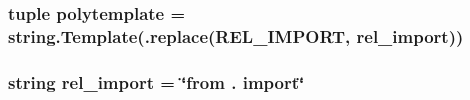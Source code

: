 \subsubsection[{polytemplate}]{\setlength{\rightskip}{0pt plus 5cm}tuple polytemplate = string.\+Template(.replace(\textquotesingle{}R\+E\+L\+\_\+\+I\+M\+P\+O\+R\+T\textquotesingle{}, {\bf rel\+\_\+import}))}\label{namespacepyneb_1_1utils_1_1polytemplate_a7ee2416855723d9fcee3328ec01ad826}
\hypertarget{namespacepyneb_1_1utils_1_1polytemplate_aa83c10e04dfe538e76bb3ef660edeff9}{}
\subsubsection[{rel\+\_\+import}]{\setlength{\rightskip}{0pt plus 5cm}string rel\+\_\+import = \char`\"{}from . import\char`\"{}}\label{namespacepyneb_1_1utils_1_1polytemplate_aa83c10e04dfe538e76bb3ef660edeff9}
